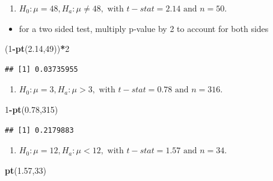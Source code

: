 \documentclass[
  openany]{book}
\newenvironment{Shaded}{\begin{snugshade}}{\end{snugshade}}
\newcommand{\DecValTok}[1]{\textcolor[rgb]{0.00,0.00,0.81}{#1}}
\newcommand{\FloatTok}[1]{\textcolor[rgb]{0.00,0.00,0.81}{#1}}
\newcommand{\FunctionTok}[1]{\textcolor[rgb]{0.13,0.29,0.53}{\textbf{#1}}}
\newcommand{\NormalTok}[1]{#1}
\newcommand{\SpecialCharTok}[1]{\textcolor[rgb]{0.81,0.36,0.00}{\textbf{#1}}}
\providecommand{\tightlist}{%
  \setlength{\itemsep}{0pt}\setlength{\parskip}{0pt}}
\begin{document}
\begin{enumerate}
\def\labelenumi{\alph{enumi}.}
\tightlist
\item
  \(H_0: \mu=48, H_a: \mu \ne 48, \text{ with } t-stat=2.14 \text{ and } n=50.\)
\end{enumerate}

\begin{itemize}
\tightlist
\item
  for a two sided test, multiply p-value by 2 to account for both sides
\end{itemize}

\begin{Shaded}
\begin{Highlighting}[]
\NormalTok{(}\DecValTok{1}\SpecialCharTok{{-}}\FunctionTok{pt}\NormalTok{(}\FloatTok{2.14}\NormalTok{,}\DecValTok{49}\NormalTok{))}\SpecialCharTok{*}\DecValTok{2}
\end{Highlighting}
\end{Shaded}

\begin{verbatim}
## [1] 0.03735955
\end{verbatim}

\begin{enumerate}
\def\labelenumi{\alph{enumi}.}
\setcounter{enumi}{1}
\tightlist
\item
  \(H_0: \mu=3, H_a: \mu >3, \text{ with } t-stat=0.78 \text{ and } n=316.\)
\end{enumerate}

\begin{Shaded}
\begin{Highlighting}[]
\DecValTok{1}\SpecialCharTok{{-}}\FunctionTok{pt}\NormalTok{(}\FloatTok{0.78}\NormalTok{,}\DecValTok{315}\NormalTok{)}
\end{Highlighting}
\end{Shaded}

\begin{verbatim}
## [1] 0.2179883
\end{verbatim}

\begin{enumerate}
\def\labelenumi{\alph{enumi}.}
\setcounter{enumi}{2}
\tightlist
\item
  \(H_0: \mu=12, H_a: \mu <12, \text{ with } t-stat=1.57 \text{ and } n=34.\)
\end{enumerate}

\begin{Shaded}
\begin{Highlighting}[]
\FunctionTok{pt}\NormalTok{(}\FloatTok{1.57}\NormalTok{,}\DecValTok{33}\NormalTok{)}
\end{Highlighting}
\end{Shaded}
\end{document}
